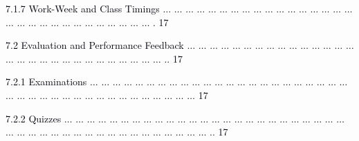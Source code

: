 \documentclass[12pt]{article}
\begin{document}
\vspace{\baselineskip}
\begin{adjustwidth}{0.5in}{0.0in}
{\fontsize{7pt}{8.4pt}\selectfont \textcolor[HTML]{00000A}{7.1.7 Work-Week and Class Timings $ \ldots $ $ \ldots $ $ \ldots $ $ \ldots $ $ \ldots $ $ \ldots $ $ \ldots $ $ \ldots $ $ \ldots $ $ \ldots $ $ \ldots $ $ \ldots $ $ \ldots $ $ \ldots $ $ \ldots $ $ \ldots $ $ \ldots $ $ \ldots $ $ \ldots $ $ \ldots $ $ \ldots $ $ \ldots $ $ \ldots $ $ \ldots $ $ \ldots $ $ \ldots $ $ \ldots $ $ \ldots $ $ \ldots $ $ \ldots $ . 17}\par}\par

\end{adjustwidth}


\vspace{\baselineskip}
\begin{adjustwidth}{0.21in}{0.0in}
{\fontsize{7pt}{8.4pt}\selectfont \textcolor[HTML]{00000A}{7.2 Evaluation and Performance Feedback $ \ldots $ $ \ldots $ $ \ldots $ $ \ldots $ $ \ldots $ $ \ldots $ $ \ldots $ $ \ldots $ $ \ldots $ $ \ldots $ $ \ldots $ $ \ldots $ $ \ldots $ $ \ldots $ $ \ldots $ $ \ldots $ $ \ldots $ $ \ldots $ $ \ldots $ $ \ldots $ $ \ldots $ $ \ldots $ $ \ldots $ $ \ldots $ $ \ldots $ $ \ldots $ $ \ldots $ $ \ldots $ $ \ldots $ .. 17}\par}\par

\end{adjustwidth}


\vspace{\baselineskip}
\begin{adjustwidth}{0.5in}{0.0in}
{\fontsize{7pt}{8.4pt}\selectfont \textcolor[HTML]{00000A}{7.2.1 Examinations $ \ldots $ $ \ldots $ $ \ldots $ $ \ldots $ $ \ldots $ $ \ldots $ $ \ldots $ $ \ldots $ $ \ldots $ $ \ldots $ $ \ldots $ $ \ldots $ $ \ldots $ $ \ldots $ $ \ldots $ $ \ldots $ $ \ldots $ $ \ldots $ $ \ldots $ $ \ldots $ $ \ldots $ $ \ldots $ $ \ldots $ $ \ldots $ $ \ldots $ $ \ldots $ $ \ldots $ $ \ldots $ $ \ldots $ $ \ldots $ $ \ldots $ $ \ldots $ $ \ldots $ $ \ldots $ $ \ldots $ $ \ldots $ $ \ldots $ $ \ldots $ $ \ldots $ $ \ldots $  17}\par}\par

\end{adjustwidth}


\vspace{\baselineskip}
\begin{adjustwidth}{0.5in}{0.0in}
{\fontsize{7pt}{8.4pt}\selectfont \textcolor[HTML]{00000A}{7.2.2 Quizzes $ \ldots $ $ \ldots $ $ \ldots $ $ \ldots $ $ \ldots $ $ \ldots $ $ \ldots $ $ \ldots $ $ \ldots $ $ \ldots $ $ \ldots $ $ \ldots $ $ \ldots $ $ \ldots $ $ \ldots $ $ \ldots $ $ \ldots $ $ \ldots $ $ \ldots $ $ \ldots $ $ \ldots $ $ \ldots $ $ \ldots $ $ \ldots $ $ \ldots $ $ \ldots $ $ \ldots $ $ \ldots $ $ \ldots $ $ \ldots $ $ \ldots $ $ \ldots $ $ \ldots $ $ \ldots $ $ \ldots $ $ \ldots $ $ \ldots $ $ \ldots $ $ \ldots $ $ \ldots $ $ \ldots $ $ \ldots $ $ \ldots $ .. 17}\par}\par

\end{adjustwidth}
\end{document}
